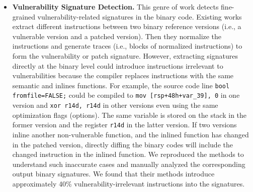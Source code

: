 \begin{itemize}
 \item\textbf{Vulnerability Signature Detection.} This genre of work \cite{vmpbl, viva, binxray} detects fine-grained vulnerability-related signatures in the binary code. 
 Existing works extract different instructions between two binary reference versions (i.e., a vulnerable version and a patched version). 
 Then they normalize the instructions and generate traces (i.e., blocks of normalized instructions) to form the vulnerability or patch signature. 
 However, extracting signatures directly at the binary level could introduce instructions irrelevant to vulnerabilities because the compiler replaces instructions with the same semantic and inlines functions. 
 For example, the source code line \texttt{bool fromfile=FALSE;} could be compiled to \texttt{mov [rsp+48h+var\_39], 0} in one version and \texttt{xor r14d, r14d} in other versions even using the same optimization flags (options). 
 The same variable is stored on the stack in the former version and the register \texttt{r14d} in the latter version. 
 If two versions inline another non-vulnerable function, and the inlined function has changed in the patched version, directly diffing the binary codes will include the changed instruction in the inlined function. 
 We reproduced the methods to understand such inaccurate cases and manually analyzed the corresponding output binary signatures. 
 We found that their methods introduce approximately 40\% vulnerability-irrelevant instructions into the signatures.
\end{itemize}



